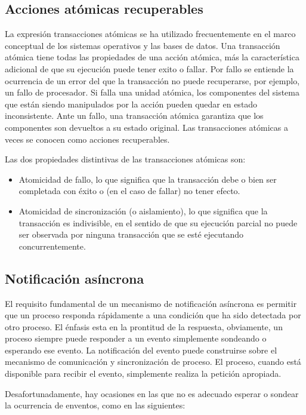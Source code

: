 \subsection{Acciones atómicas recuperables}

La expresión transacciones atómicas se ha utilizado frecuentemente en el marco
conceptual de los sistemas operativos y las bases de datos. Una transacción
atómica tiene todas las propiedades de una acción atómica, más la
característica adicional de que su ejecución puede tener exito o fallar. Por
fallo se entiende la ocurrencia de un error del que la transacción no puede
recuperarse, por ejemplo, un fallo de procesador. Si falla una unidad atómica,
los componentes del sistema que están siendo manipulados por la acción pueden
quedar en estado inconsistente. Ante un fallo, una transacción atómica
garantiza que los componentes son devueltos a su estado original. Las
transacciones atómicas a veces se conocen como acciones recuperables.

Las dos propiedades distintivas de las transacciones atómicas son:

\begin{itemize}
	\item Atomicidad de fallo, lo que significa que la transacción debe o
		bien ser completada con éxito o (en el caso de fallar) no tener
		efecto.
	\item Atomicidad de sincronización (o aislamiento), lo que significa
		que la transacción es indivisible, en el sentido de que su
		ejecución parcial no puede ser observada por ninguna transacción
		que se esté ejecutando concurrentemente.
\end{itemize}

\subsection{Notificación asíncrona}

El requisito fundamental de un mecanismo de notificación asíncrona es permitir
que un proceso responda rápidamente a una condición que ha sido detectada por
otro proceso. El énfasis esta en la prontitud de la respuesta, obviamente, un
proceso siempre puede responder a un evento simplemente sondeando o esperando
ese evento. La notificación del evento puede construirse sobre el mecanismo de
comunicación y sincronización de proceso. El proceso, cuando está disponible
para recibir el evento, simplemente realiza la petición apropiada.

Desafortunadamente, hay ocasiones en las que no es adecuado esperar o sondear la
ocurrencia de enventos, como en las siguientes:

